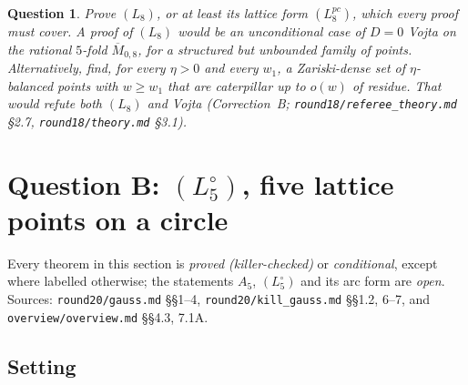 \documentclass[11pt]{article}
\newtheorem{question}{Question}
\newcommand{\Mbar}{\overline M_{0,8}}
\newcommand{\rec}[1]{\texttt{#1}}
\begin{document}
\begin{question}\label{q:A}
Prove \((L_8)\), or at least its lattice form \((L_8^{pc})\), which every proof
must cover.  A proof of \((L_8)\) would be an unconditional case of \(D=0\)
Vojta on the rational \(5\)-fold \(\Mbar\), for a structured but unbounded
family of points.  Alternatively, find, for every \(\eta>0\) and every \(w_1\),
a Zariski-dense set of \(\eta\)-balanced points with \(w\ge w_1\) that are
caterpillar up to \(o(w)\) of residue.  That would refute both \((L_8)\) and
Vojta (Correction~B; \rec{round18/referee\_theory.md} \S2.7,
\rec{round18/theory.md} \S3.1).
\end{question}

\section{Question B: \texorpdfstring{\((L_5^\circ)\)}{(L5 circ)}, five lattice points on a circle}\label{sec:B}

Every theorem in this section is \emph{proved (killer-checked)} or
\emph{conditional}, except where labelled otherwise; the statements \(A_5\),
\((L_5^\circ)\) and its arc form are \emph{open}.  Sources:
\rec{round20/gauss.md} \S\S1--4, \rec{round20/kill\_gauss.md} \S\S1.2, 6--7,
and \rec{overview/overview.md} \S\S4.3, 7.1A.

\subsection{Setting}
\end{document}

